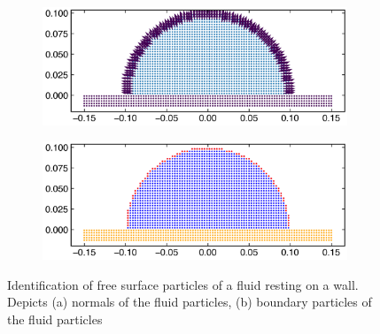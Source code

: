 \begin{figure}
  \centering
  \begin{subfigure}{0.48\textwidth}
    \centering
    \includegraphics[width=1\linewidth]{figures/ctvf/figures/free_surface_identification_demonstration/circle_with_boundary_normals}
    \subcaption{}%
    \label{fig:boundary-particles-circle-wall-normals}
  \end{subfigure}
  \begin{subfigure}{0.48\textwidth}
    \centering
    \includegraphics[width=1\linewidth]{figures/ctvf/figures/free_surface_identification_demonstration/circle_with_boundary}
    \subcaption{}%
    \label{fig:boundary-particles-circle-wall-bp}
  \end{subfigure}
  \caption{Identification of free surface particles of a fluid resting on a
    wall. Depicts (a) normals of the fluid particles, (b) boundary particles
    of the fluid particles}
\label{fig:boundary-particles-circle-wall}
\end{figure}
